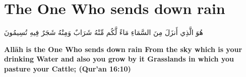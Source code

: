\chapter{The One Who sends down rain}
\begin{center}
    {\Huge    
        \begin{Arabic}
            هُوَ الَّذِي أَنزَلَ مِنَ السَّمَاءِ مَاءً لَّكُم مِّنْهُ شَرَابٌ وَمِنْهُ شَجَرٌ فِيهِ تُسِيمُونَ
        \end{Arabic}
    }    
\end{center}
\vspace*{\fill}
\vspace{3cm}
\begin{center}
    \large \textbf{Allāh is the One Who sends down rain From the sky which is your drinking Water and also you grow by it Grasslands in which you pasture your Cattle; (Qur'an 16:10)}
\end{center}
